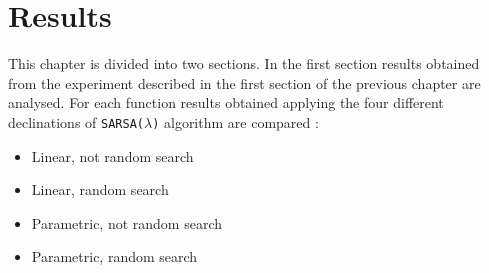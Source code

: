\chapter{Results}

This chapter is divided into two sections. In the first section results obtained from the experiment described in the first section of the previous chapter are analysed. For each function results obtained applying the four different declinations of {\tt SARSA($\lambda$)} algorithm are compared :

\begin{itemize}
	\item Linear, not random search
	\item Linear, random search
	\item Parametric, not random search
	\item Parametric, random search
\end{itemize}

